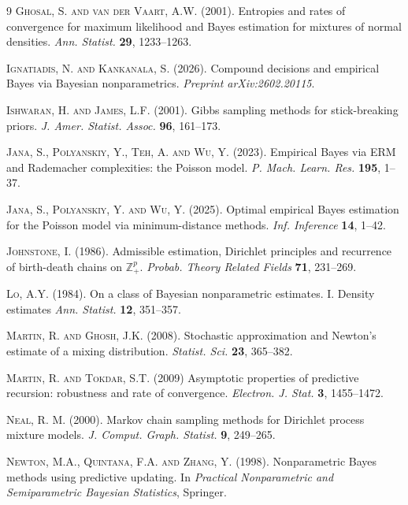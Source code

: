 \documentclass[twoside,12pt]{article}
\begin{document}
\begin{thebibliography}{9}
\textsc{Ghosal, S. and van der Vaart, A.W.} (2001). Entropies and rates of convergence for maximum likelihood and Bayes estimation for mixtures of normal densities. \textit{Ann. Statist.} \textbf{29}, 1233--1263.

\textsc{Ignatiadis, N. and Kankanala, S.} (2026). Compound decisions and empirical Bayes via Bayesian nonparametrics. \textit{Preprint arXiv:2602.20115}.

\textsc{Ishwaran, H. and James, L.F.} (2001). Gibbs sampling methods for stick-breaking priors. \textit{J. Amer. Statist. Assoc.} \textbf{96}, 161--173.

\textsc{Jana, S., Polyanskiy, Y., Teh, A. and Wu, Y.} (2023). Empirical Bayes via ERM and Rademacher complexities: the Poisson model. \textit{P. Mach. Learn. Res.} \textbf{195}, 1--37.

\textsc{Jana, S., Polyanskiy, Y. and Wu, Y.} (2025). Optimal empirical Bayes estimation for the Poisson model via minimum-distance methods. \textit{Inf. Inference} \textbf{14}, 1--42.

\textsc{Johnstone, I.} (1986). Admissible estimation, Dirichlet principles and recurrence of birth-death chains on $\mathbb{Z}_{+}^{p}$.  \textit{Probab. Theory Related Fields} \textbf{71}, 231--269.

\textsc{Lo, A.Y.} (1984). On a class of Bayesian nonparametric estimates. I. Density estimates \textit{Ann. Statist.} \textbf{12}, 351--357.

\textsc{Martin, R. and Ghosh, J.K.} (2008). Stochastic approximation and Newton’s estimate of a mixing distribution. \textit{Statist. Sci.} \textbf{23}, 365--382.

\textsc{Martin, R. and  Tokdar, S.T.} (2009) Asymptotic properties of predictive recursion: robustness and rate of convergence. \textit{Electron. J. Stat.} \textbf{3}, 1455--1472.

\textsc{Neal, R. M.} (2000). Markov chain sampling methods for Dirichlet process mixture models. \textit{J. Comput. Graph. Statist.} \textbf{9}, 249--265.

\textsc{Newton, M.A., Quintana, F.A. and Zhang, Y.} (1998). Nonparametric Bayes methods using predictive updating. In \textit{Practical Nonparametric and Semiparametric Bayesian Statistics}, Springer.


\end{thebibliography}
\end{document}
